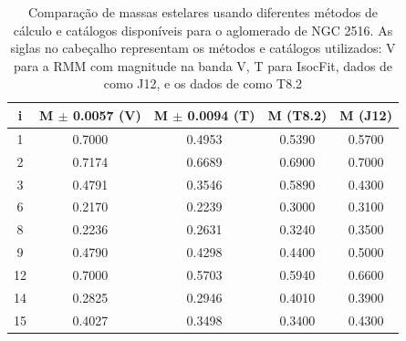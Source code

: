 \begin{table}[htbp]
\centering
\caption[Resultados de massas estelares para NGC 2516]{Comparação de massas estelares usando diferentes métodos de cálculo e catálogos disponíveis para o aglomerado de NGC 2516. As siglas no cabeçalho representam os métodos e catálogos utilizados: V para a RMM com magnitude na banda V, T para IsocFit, dados de  como J12, e os dados de   como T8.2}
\label{tab:ngc2516_massas}
\begin{tabular}{ccccc}
\hline
{i} & {M $\pm$ 0.0057 (V)} & {M $\pm$ 0.0094 (T)}  & {M (T8.2)} & {M (J12)} \\ \hline
        1   & 0.7000 & 0.4953 & 0.5390 & 0.5700 \\
		2   & 0.7174 & 0.6689 & 0.6900 & 0.7000 \\
		3   & 0.4791 & 0.3546 & 0.5890 & 0.4300 \\
		6   & 0.2170 & 0.2239 & 0.3000 & 0.3100 \\
		8   & 0.2236 & 0.2631 & 0.3240 & 0.3500 \\
		9   & 0.4790 & 0.4298 & 0.4400 & 0.5000 \\
		12  & 0.7000 & 0.5703 & 0.5940 & 0.6600 \\
		14  & 0.2825 & 0.2946 & 0.4010 & 0.3900 \\
		15  & 0.4027 & 0.3498 & 0.3400 & 0.4300 \\
        \hline
\end{tabular}
\end{table}
